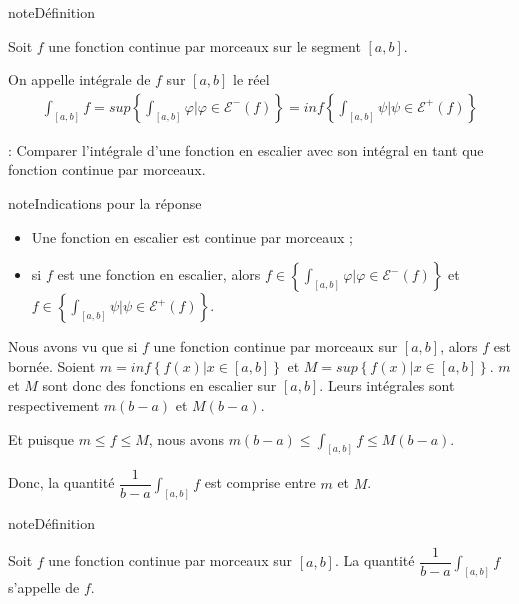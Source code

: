 \documentclass[letterpaper,10pt,french]{jupyterBook}
\begin{document}
\begin{sphinxadmonition}{note}{Définition}

\sphinxAtStartPar
Soit \(f\) une fonction continue par morceaux sur le segment \([a, b]\).

\sphinxAtStartPar
On appelle intégrale de \(f\) sur \([a, b]\) le réel
\begin{equation*}
\begin{split}
\int_{[a, b]} f = sup\left\{\int_{[a, b]} \varphi | \varphi \in \mathcal{E}^-(f)\right\}= inf\left\{\int_{[a, b]} \psi | \psi \in \mathcal{E}^+(f)\right\}
\end{split}
\end{equation*}\end{sphinxadmonition}

\sphinxAtStartPar
{} : Comparer l’intégrale d’une fonction en escalier avec son intégral en tant que fonction continue par morceaux.

\begin{sphinxadmonition}{note}{Indications pour la réponse}
\begin{itemize}
\item {} 
\sphinxAtStartPar
Une fonction en escalier est continue par morceaux ;

\item {} 
\sphinxAtStartPar
si \(f\) est une fonction en escalier, alors \(f \in \left\{\int_{[a, b]} \varphi | \varphi \in \mathcal{E}^-(f)\right\}\) et \( f \in \left\{\int_{[a, b]} \psi | \psi \in \mathcal{E}^+(f)\right\}\).

\end{itemize}
\end{sphinxadmonition}

\sphinxAtStartPar
Nous avons vu que si \(f\) une fonction continue par morceaux sur \([a, b]\), alors \(f\) est bornée. Soient \(m = inf \left\{f(x)| x\in [a, b]\right\}\) et \(M = sup \left\{f(x)| x\in [a, b]\right\}\). \(m\) et \(M\) sont donc des fonctions en escalier sur \([a, b]\). Leurs intégrales sont respectivement \(m(b-a)\) et \(M(b-a)\).

\sphinxAtStartPar
Et puisque \(m \leq f \leq M\), nous avons \(m(b-a)\leq \int_{[a,b]} f \leq M(b-a)\).

\sphinxAtStartPar
Donc, la quantité \(\dfrac{1}{b-a}\int_{[a, b]} f\) est comprise entre \(m\) et \(M\).

\begin{sphinxadmonition}{note}{Définition}

\sphinxAtStartPar
Soit \(f\) une fonction continue par morceaux sur \([a, b]\). La quantité \(\dfrac{1}{b-a}\int_{[a, b]} f\) s’appelle  de \(f\).
\end{sphinxadmonition}
\end{document}
